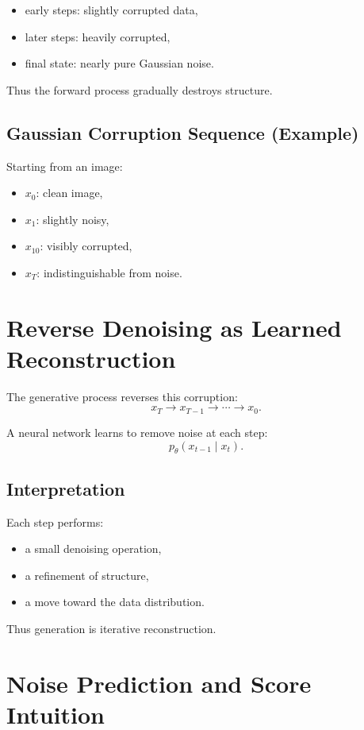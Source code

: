 \begin{itemize}
    \item early steps: slightly corrupted data,
    \item later steps: heavily corrupted,
    \item final state: nearly pure Gaussian noise.
\end{itemize}

Thus the forward process gradually destroys structure.

\subsection{Gaussian Corruption Sequence (Example)}

Starting from an image:
\begin{itemize}
    \item $x_0$: clean image,
    \item $x_1$: slightly noisy,
    \item $x_{10}$: visibly corrupted,
    \item $x_T$: indistinguishable from noise.
\end{itemize}

\section{Reverse Denoising as Learned Reconstruction}

The generative process reverses this corruption:
\[
x_T \to x_{T-1} \to \cdots \to x_0.
\]

A neural network learns to remove noise at each step:
\[
p_\theta(x_{t-1} \mid x_t).
\]

\subsection{Interpretation}

Each step performs:
\begin{itemize}
    \item a small denoising operation,
    \item a refinement of structure,
    \item a move toward the data distribution.
\end{itemize}

Thus generation is iterative reconstruction.

\section{Noise Prediction and Score Intuition}

